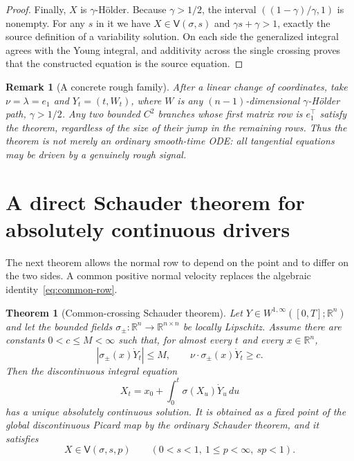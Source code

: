 \documentclass[11pt]{article}
\newtheorem{theorem}{Theorem}
\newtheorem{remark}{Remark}
\newcommand{\R}{\mathbb{R}}
\newcommand{\V}{\mathsf{V}}
\begin{document}
\begin{proof}
Finally, $X$ is $\gamma$-H\"older.  Because $\gamma>1/2$, the interval
$((1-\gamma)/\gamma,1)$ is nonempty.  For any $s$ in it we have
$X\in\V(\sigma,s)$ and $\gamma s+\gamma>1$, exactly the source definition of
a variability solution.  On each side the generalized integral agrees with
the Young integral, and additivity across the single crossing proves that the
constructed equation is the source equation.
\end{proof}

\begin{remark}[A concrete rough family]
After a linear change of coordinates, take $\nu=\lambda=e_1$ and
$Y_t=(t,W_t)$, where $W$ is any $(n-1)$-dimensional $\gamma$-H\"older path,
$\gamma>1/2$.  Any two bounded $C^2$ branches whose first matrix row is
$e_1^\top$ satisfy the theorem, regardless of the size of their jump in the
remaining rows.  Thus the theorem is not merely an ordinary smooth-time ODE:
all tangential equations may be driven by a genuinely rough signal.
\end{remark}

\section{A direct Schauder theorem for absolutely continuous drivers}

The next theorem allows the normal row to depend on the point and to differ on
the two sides.  A common positive normal velocity replaces the algebraic
identity~\eqref{eq:common-row}.

\begin{theorem}[Common-crossing Schauder theorem]\label{thm:schauder}
Let $Y\in W^{1,\infty}([0,T];\R^n)$ and let the bounded fields
$\sigma_\pm:\R^n\to\R^{n\times n}$ be locally Lipschitz.  Assume there are
constants $0<c\leq M<\infty$ such that, for almost every $t$ and every
$x\in\R^n$,
\begin{equation}\label{eq:crossing}
 |\sigma_\pm(x)\dot Y_t|\leq M,
 \qquad
 \nu\cdot\sigma_\pm(x)\dot Y_t\geq c.
\end{equation}
Then the discontinuous integral equation
\[
 X_t=x_0+\int_0^t\sigma(X_u)\dot Y_u\,du
\]
has a unique absolutely continuous solution.  It is obtained as a fixed point
of the global discontinuous Picard map by the ordinary Schauder theorem, and
it satisfies
\[
 X\in\V(\sigma,s,p)
 \qquad(0<s<1,\ 1\leq p<\infty,\ sp<1).
\]
\end{theorem}
\end{document}
